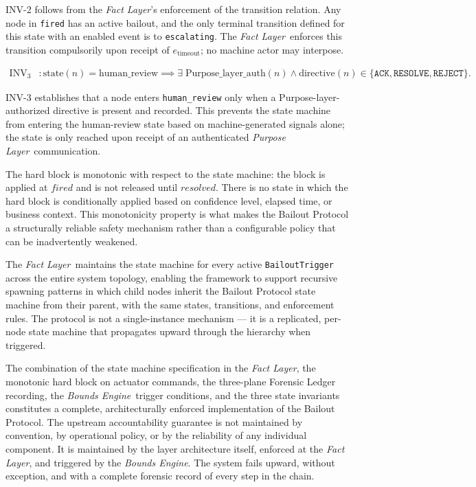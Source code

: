 \documentclass[12pt]{article}
\newcommand{\purpose}{\textit{Purpose Layer}}
\newcommand{\bounds}{\textit{Bounds Engine}}
\newcommand{\fact}{\textit{Fact Layer}}
\begin{document}
INV-2 follows from the \fact's enforcement of the transition relation. Any node in \texttt{fired} has an active bailout, and the only terminal transition defined for this state with an enabled event is to \texttt{escalating}. The \fact\ enforces this transition compulsorily upon receipt of $e_{\mathrm{timeout}}$; no machine actor may interpose.

\begin{align}
\mathrm{INV}_3 &: \mathrm{state}(n) = \mathrm{human\_review} \implies \exists\; \mathrm{Purpose\_layer\_auth}(n) \land \mathrm{directive}(n) \in \{\texttt{ACK}, \texttt{RESOLVE}, \texttt{REJECT}\}. \tag{INV-3}
\end{align}

INV-3 establishes that a node enters \texttt{human\_review} only when a Purpose-layer-authorized directive is present and recorded. This prevents the state machine from entering the human-review state based on machine-generated signals alone; the state is only reached upon receipt of an authenticated \purpose\ communication.

The hard block is monotonic with respect to the state machine: the block is applied at $fired$ and is not released until $resolved$. There is no state in which the hard block is conditionally applied based on confidence level, elapsed time, or business context. This monotonicity property is what makes the Bailout Protocol a structurally reliable safety mechanism rather than a configurable policy that can be inadvertently weakened.

The \fact\ maintains the state machine for every active \texttt{BailoutTrigger} across the entire system topology, enabling the framework to support recursive spawning patterns in which child nodes inherit the Bailout Protocol state machine from their parent, with the same states, transitions, and enforcement rules. The protocol is not a single-instance mechanism --- it is a replicated, per-node state machine that propagates upward through the hierarchy when triggered.

The combination of the state machine specification in the \fact, the monotonic hard block on actuator commands, the three-plane Forensic Ledger recording, the \bounds\ trigger conditions, and the three state invariants constitutes a complete, architecturally enforced implementation of the Bailout Protocol. The upstream accountability guarantee is not maintained by convention, by operational policy, or by the reliability of any individual component. It is maintained by the layer architecture itself, enforced at the \fact, and triggered by the \bounds. The system fails upward, without exception, and with a complete forensic record of every step in the chain.
\end{document}
